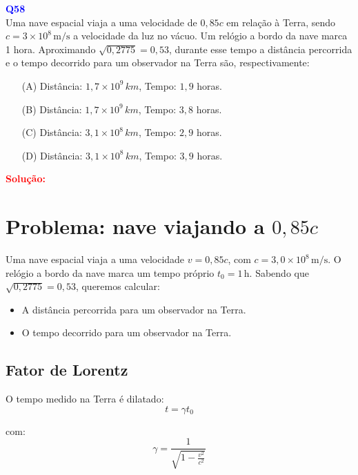 \documentclass[a4paper,12pt]{article}
\begin{document}
\begin{flushleft}
\textbf{\textcolor{blue}{\Large Q58}}\\
\noindent
Uma nave espacial viaja a uma velocidade de \(0{,}85c\) em relação à Terra, sendo \(c = 3 \times 10^8\, \mathrm{m/s}\) 
a velocidade da luz no vácuo. Um relógio a bordo da nave marca 1 hora. Aproximando \( \sqrt{0{,}2775} = 0{,}53 \), 
durante esse tempo a distância percorrida e o tempo decorrido para um observador na Terra são, respectivamente:


\begin{itemize}
\item[(A)] Distância: \(1{,}7 \times 10^9\, km\), Tempo: \(1{,}9\) horas.
\item[(B)] Distância: \(1{,}7 \times 10^9\, km\), Tempo: \(3{,}8\) horas.
\item[(C)] Distância: \(3{,}1 \times 10^8\, km\), Tempo: \(2{,}9\) horas.
\item[(D)] Distância: \(3{,}1 \times 10^8\, km\), Tempo: \(3{,}9\) horas.
\end{itemize}

\vspace{0.5cm}

\textcolor{red}{\textbf{Solução:}}\\

\section*{Problema: nave viajando a \(0{,}85c\)}

Uma nave espacial viaja a uma velocidade \(v = 0{,}85c\), com \(c = 3{,}0 \times 10^8\, \mathrm{m/s}\).  
O relógio a bordo da nave marca um tempo próprio \(t_0 = 1\,\mathrm{h}\).  
Sabendo que \(\sqrt{0{,}2775} = 0{,}53\), queremos calcular:

\begin{itemize}
    \item A distância percorrida para um observador na Terra.
    \item O tempo decorrido para um observador na Terra.
\end{itemize}

\subsection*{Fator de Lorentz}

O tempo medido na Terra é dilatado:
\[
t = \gamma t_0
\]

com:
\[
\gamma = \frac{1}{\sqrt{1-\frac{v^2}{c^2}}}
\]


\end{flushleft}
\end{document}
